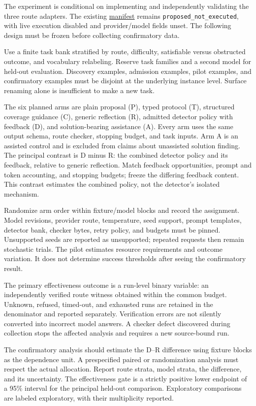 \documentclass[
  11pt,
]{article}
\begin{document}
The experiment is conditional on implementing and independently
validating the three route adapters. The existing
\href{demos/demo_3/experiment_manifest.yaml}{manifest} remains
\texttt{\nolinkurl{proposed_not_executed}}, with live execution
disabled and provider/model fields unset. The following design must be
frozen before collecting confirmatory data.

Use a finite task bank stratified by route, difficulty, satisfiable
versus obstructed outcome, and vocabulary relabeling. Reserve task
families and a second model for held-out evaluation. Discovery examples,
admission examples, pilot examples, and confirmatory examples must be
disjoint at the underlying instance level. Surface renaming alone is
insufficient to make a new task.

The six planned arms are plain proposal (P), typed protocol (T),
structured coverage guidance (C), generic reflection (R), admitted
detector policy with feedback (D), and solution-bearing assistance (A).
Every arm uses the same output schema, route checker, stopping budget,
and task inputs. Arm A is an assisted control and is excluded from
claims about unassisted solution finding. The principal contrast is D
minus R: the combined detector policy and its feedback, relative to
generic reflection. Match feedback opportunities, prompt and token
accounting, and stopping budgets; freeze the differing feedback content.
This contrast estimates the combined policy, not the detector's isolated
mechanism.

Randomize arm order within fixture/model blocks and record the
assignment. Model revisions, provider route, temperature, seed support,
prompt templates, detector bank, checker bytes, retry policy, and
budgets must be pinned. Unsupported seeds are reported as unsupported;
repeated requests then remain stochastic trials. The pilot estimates
resource requirements and outcome variation. It does not determine
success thresholds after seeing the confirmatory result.

The primary effectiveness outcome is a run-level binary variable: an
independently verified route witness obtained within the common budget.
Unknown, refused, timed-out, and exhausted runs are retained in the
denominator and reported separately. Verification errors are not
silently converted into incorrect model answers. A checker defect
discovered during collection stops the affected analysis and requires a
new source-bound run.

The confirmatory analysis should estimate the D--R difference using
fixture blocks as the dependence unit. A prespecified paired or
randomization analysis must respect the actual allocation. Report route
strata, model strata, the difference, and its uncertainty. The
effectiveness gate is a strictly positive lower endpoint of a 95\%
interval for the principal held-out comparison. Exploratory comparisons
are labeled exploratory, with their multiplicity reported.
\end{document}
